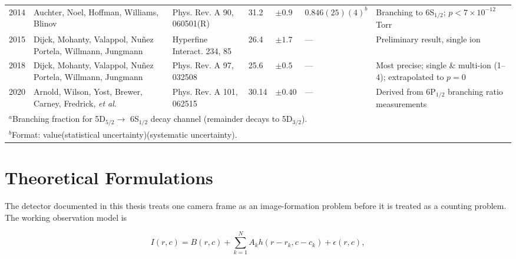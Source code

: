 \documentclass[12pt]{report}
\begin{document}
\begin{table}[htbp]
\begin{tabular}{p{0.7cm}p{3.5cm}p{3cm}p{1.5cm}p{2cm}p{2.5cm}p{4cm}}
2014 & Auchter, Noel, Hoffman, Williams, Blinov & Phys. Rev. A 90, 060501(R) & 31.2 & $\pm 0.9$ & $0.846(25)(4)^b$ & Branching to 6S$_{1/2}$; $p < 7 \times 10^{-12}$ Torr \\[0.5ex]

2015 & Dijck, Mohanty, Valappol, Nu\~{n}ez Portela, Willmann, Jungmann & Hyperfine Interact. 234, 85 & 26.4 & $\pm 1.7$ & --- & Preliminary result, single ion \\[0.5ex]

2018 & Dijck, Mohanty, Valappol, Nu\~{n}ez Portela, Willmann, Jungmann & Phys. Rev. A 97, 032508 & 25.6 & $\pm 0.5$ & --- & Most precise; single \& multi-ion (1--4); extrapolated to $p=0$ \\[0.5ex] %

2020 & Arnold, Wilson, Yost, Brewer, Carney, Fredrick, \textit{et al.} & Phys. Rev. A 101, 062515 & 30.14 & $\pm 0.40$ & --- & Derived from 6P$_{1/2}$ branching ratio measurements \\[0.5ex]


\hline\hline %

\multicolumn{7}{l}{$^a$Branching fraction for 5D$_{5/2} \to$ 6S$_{1/2}$ decay channel (remainder decays to 5D$_{3/2}$).} \\ %

\multicolumn{7}{l}{$^b$Format: value(statistical uncertainty)(systematic uncertainty).} \\

\end{tabular} %

\end{table} %

\section{Theoretical Formulations}

The detector documented in this thesis treats one camera frame as an image-formation problem before it is treated as a counting problem. The working observation model is

$$
I(r,c) = B(r,c) + \sum_{k=1}^{N} A_k h(r-r_k,c-c_k) + \epsilon(r,c),
$$
\end{document}
